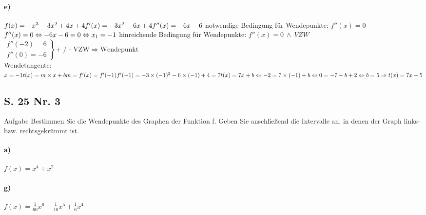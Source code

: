 \documentclass[arbeitsmappe.tex]{subfiles}
\begin{document}
    \paragraph{e)}
    $
    f(x) = -x^3 - 3x^2 + 4x + 4 \\
    f'(x) = -3x^2 - 6x + 4 \\
    f''(x) = -6x - 6 \\
    $
    notwendige Bedingung für Wendepunkte: $f''(x) = 0$ \\
    $
    f''(x) = 0 \\
    \Leftrightarrow -6x - 6 = 0 \\
    \Leftrightarrow x_1 = -1 \\
    $
    hinreichende Bedingung für Wendepunkte: $f''(x) = 0\ \land\ VZW$ \\
    $
    \left.
    \begin{array}{l}
        f''(-2) = 6 \\
        f''(0) = -6
    \end{array}
    \right\} \text{+ / - VZW} \Rightarrow \text{Wendepunkt}
    $
    \\
    Wendetangente:
    $
    x = -1 \\
    t(x) = m \times x + b \\
    m = f'(x) = f'(-1) \\
    f'(-1) = -3 \times (-1)^2 - 6 \times (-1) + 4 = 7 \\
    t(x) = 7x + b \\
    \Leftrightarrow -2 = 7 \times (-1) + b \\
    \Leftrightarrow 0 = -7 + b + 2 \\
    \Leftrightarrow b = 5 \\
    \Rightarrow t(x) = 7x + 5
    $
    \\
    \newpage

    \subsection{S. 25 Nr. 3}
    \begin{rblock}{Aufgabe}
        Bestimmen Sie die Wendepunkte des Graphen der Funktion f.
        Geben Sie anschließend die Intervalle an, in denen der Graph links- bzw. rechtsgekrümmt ist.

        \paragraph{a)} $f(x) = x^4 + x^2$

        \paragraph{g)} $f(x) = \frac{1}{60}x^6 - \frac{1}{10}x^5 + \frac{1}{6}x^4$
    \end{rblock}
\end{document}
